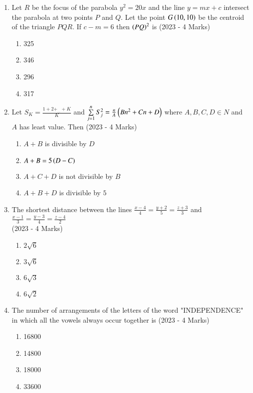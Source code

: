 \documentclass[journal]{IEEEtran}
\begin{document}
\begin{enumerate}
{}
\item{
Let $R$ be the focus of the parabola $y^2=20x$ and the line $y=mx+c$ intersect the parabola at two points $P$ and $Q$. Let the point $G\left(10,10\right)$ be the centroid of the triangle $PQR$. If $c-m=6$ then $\left(PQ\right)^2$ is
\hfill
{(2023 - 4 Marks)}
\begin{multicols}{4}
\begin{enumerate}
\item 325
\item 346
\item 296
\item 317
\end{enumerate}
\end{multicols}
}
\item{
Let $S_K=\frac{1+2+_{...}+K}{K}$ and $\sum\limits_{j=1}^n S_j^2=\frac{n}{A}\left(Bn^2+Cn+D\right)$ where $A,B,C,D\in N$ and $A$ has least value. Then
\hfill
{(2023 - 4 Marks)}
\begin{multicols}{2}
\begin{enumerate}
\item $A+B$ is divisible by $D$
\item $A+B=5\left(D-C\right)$
\item $A+C+D$ is not divisible by $B$
\item $A+B+D$ is divisible by $5$
\end{enumerate}
\end{multicols}
}
\item{
The shortest distance between the lines $\frac{x-4}{4}=\frac{y+2}{5}=\frac{z+3}{3}$ and $\frac{x-1}{3}=\frac{y-3}{4}=\frac{z-4}{2}$\\ \text{  } 
\hfill
{(2023 - 4 Marks)}
\begin{multicols}{4}
\begin{enumerate}
\item $2\sqrt{6}$
\item $3\sqrt{6}$
\item $6\sqrt{3}$
\item $6\sqrt{2}$
\end{enumerate}
\end{multicols}
}
\item{
The number of arrangements of the letters of the word "INDEPENDENCE" in which all the vowels always occur together is
\hfill{(2023 - 4 Marks)}
\begin{multicols}{4}
\begin{enumerate}
\item 16800
\item 14800
\item 18000
\item 33600
\end{enumerate}
\end{multicols}

}
\end{enumerate}
\end{document}
